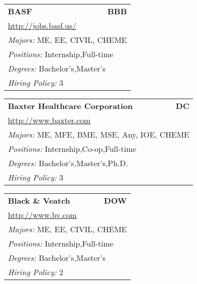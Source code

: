 \documentclass[twoside]{article}
\begin{document}
\begin{center}
\begin{multicols}{3}
\begin{FlushLeft}
\begin{minipage}{\columnwidth}
\end{minipage}
 
\begin{minipage}{\columnwidth}\begin{tabularx}{.95\columnwidth}{Xr}
                 {\Large\bf BASF} & {\Large\bf BBB}\\
    \multicolumn{2}{p{.95\columnwidth}}{\url{http://jobs.basf.us/}}\\
    \multicolumn{2}{p{.95\columnwidth}}{\emph{Majors:} ME, EE, CIVIL, CHEME}\\
    \multicolumn{2}{p{.95\columnwidth}}{\emph{Positions:} Internship,Full-time}\\
    \multicolumn{2}{p{.95\columnwidth}}{\emph{Degrees:} Bachelor's,Master's}\\
    \multicolumn{2}{p{.95\columnwidth}}{\emph{Hiring Policy:} 3}\\
    \end{tabularx}
    
\end{minipage}
 
\begin{minipage}{\columnwidth}\begin{tabularx}{.95\columnwidth}{Xr}
                 {\Large\bf Baxter Healthcare Corporation} & {\Large\bf DC}\\
    \multicolumn{2}{p{.95\columnwidth}}{\url{http://www.baxter.com}}\\
    \multicolumn{2}{p{.95\columnwidth}}{\emph{Majors:} ME, MFE, BME, MSE, Any, IOE, CHEME}\\
    \multicolumn{2}{p{.95\columnwidth}}{\emph{Positions:} Internship,Co-op,Full-time}\\
    \multicolumn{2}{p{.95\columnwidth}}{\emph{Degrees:} Bachelor's,Master's,Ph.D.}\\
    \multicolumn{2}{p{.95\columnwidth}}{\emph{Hiring Policy:} 3}\\
    \end{tabularx}
    
\end{minipage}
 
\begin{minipage}{\columnwidth}\begin{tabularx}{.95\columnwidth}{Xr}
                 {\Large\bf Black \& Veatch} & {\Large\bf DOW}\\
    \multicolumn{2}{p{.95\columnwidth}}{\url{http://www.bv.com}}\\
    \multicolumn{2}{p{.95\columnwidth}}{\emph{Majors:} ME, EE, CIVIL, CHEME}\\
    \multicolumn{2}{p{.95\columnwidth}}{\emph{Positions:} Internship,Full-time}\\
    \multicolumn{2}{p{.95\columnwidth}}{\emph{Degrees:} Bachelor's,Master's}\\
    \multicolumn{2}{p{.95\columnwidth}}{\emph{Hiring Policy:} 2}\\
    \end{tabularx}
    

\end{minipage}
\end{FlushLeft}
\end{multicols}
\end{center}
\end{document}

